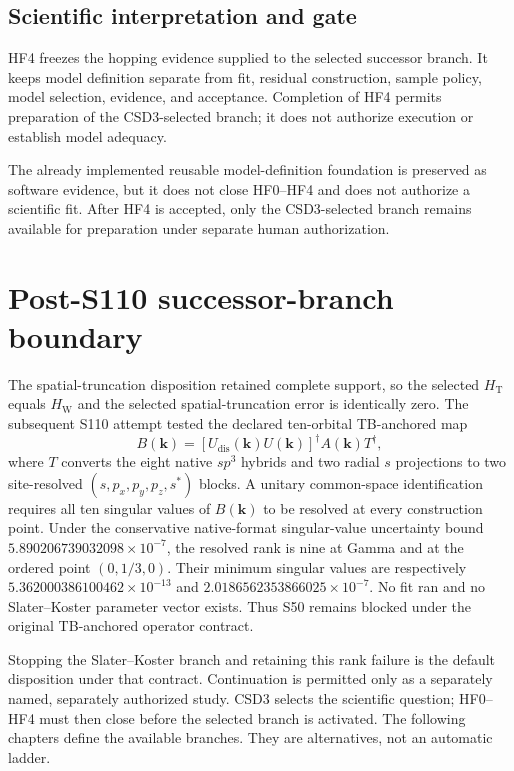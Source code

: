 \documentclass[11pt]{report}
\begin{document}
\section{Scientific interpretation and gate}

HF4 freezes the hopping evidence supplied to the selected successor branch.  It keeps
model definition separate from fit, residual construction, sample policy, model
selection, evidence, and acceptance.  Completion of HF4 permits preparation of the
CSD3-selected branch; it does not authorize execution or establish model adequacy.

The already implemented reusable model-definition foundation is preserved as software
evidence, but it does not close HF0--HF4 and does not authorize a scientific fit.  After
HF4 is accepted, only the CSD3-selected branch remains available for preparation under
separate human authorization.

\chapter{Post-S110 successor-branch boundary}

The spatial-truncation disposition retained complete support, so the selected
$H_{\mathrm{T}}$ equals $H_{\mathrm{W}}$ and the selected spatial-truncation error is
identically zero.  The subsequent S110 attempt tested the declared ten-orbital
TB-anchored map
\begin{equation}
 B(\mathbf{k})=
 \left[U_{\mathrm{dis}}(\mathbf{k})U(\mathbf{k})\right]^{\dagger}
 A(\mathbf{k})T^{\dagger},
\end{equation}
where $T$ converts the eight native $sp^3$ hybrids and two radial $s$ projections to
two site-resolved $(s,p_x,p_y,p_z,s^*)$ blocks.  A unitary common-space identification
requires all ten singular values of $B(\mathbf{k})$ to be resolved at every construction
point.  Under the conservative native-format singular-value uncertainty bound
$5.890206739032098\times10^{-7}$, the resolved rank is nine at Gamma and at the ordered
point $(0,1/3,0)$.  Their minimum singular values are respectively
$5.362000386100462\times10^{-13}$ and
$2.0186562353866025\times10^{-7}$.  No fit ran and no Slater--Koster parameter vector
exists.  Thus S50 remains blocked under the original TB-anchored operator contract.

Stopping the Slater--Koster branch and retaining this rank failure is the default
disposition under that contract.  Continuation is permitted only as a separately named, separately authorized study.
CSD3 selects the scientific question; HF0--HF4 must then close before the selected
branch is activated.  The following chapters define the available branches.  They are
alternatives, not an automatic ladder.
\end{document}
